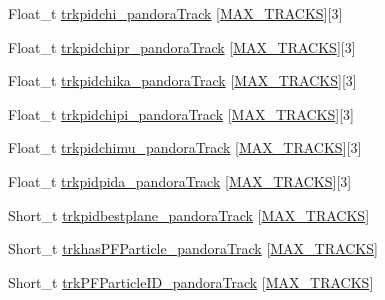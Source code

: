 \begin{DoxyCompactItemize}
\item 
Float\-\_\-t \hyperlink{classanatree_afa8d6d92e18f547d1481c2c5bf354e64}{trkpidchi\-\_\-pandora\-Track} \mbox{[}\hyperlink{anatree__core__v09410002_8h_a327fd4e796e4a0d78947524c96e4362e}{M\-A\-X\-\_\-\-T\-R\-A\-C\-K\-S}\mbox{]}\mbox{[}3\mbox{]}
\item 
Float\-\_\-t \hyperlink{classanatree_a627730b2ca665fba61264ea802ff8191}{trkpidchipr\-\_\-pandora\-Track} \mbox{[}\hyperlink{anatree__core__v09410002_8h_a327fd4e796e4a0d78947524c96e4362e}{M\-A\-X\-\_\-\-T\-R\-A\-C\-K\-S}\mbox{]}\mbox{[}3\mbox{]}
\item 
Float\-\_\-t \hyperlink{classanatree_aee3b98d0f388fbdd52ddc520b2dbdffd}{trkpidchika\-\_\-pandora\-Track} \mbox{[}\hyperlink{anatree__core__v09410002_8h_a327fd4e796e4a0d78947524c96e4362e}{M\-A\-X\-\_\-\-T\-R\-A\-C\-K\-S}\mbox{]}\mbox{[}3\mbox{]}
\item 
Float\-\_\-t \hyperlink{classanatree_ac6e609689ab0d14cc79c56d8a8e439dd}{trkpidchipi\-\_\-pandora\-Track} \mbox{[}\hyperlink{anatree__core__v09410002_8h_a327fd4e796e4a0d78947524c96e4362e}{M\-A\-X\-\_\-\-T\-R\-A\-C\-K\-S}\mbox{]}\mbox{[}3\mbox{]}
\item 
Float\-\_\-t \hyperlink{classanatree_a9d167b902c1054222e86725b09ec5829}{trkpidchimu\-\_\-pandora\-Track} \mbox{[}\hyperlink{anatree__core__v09410002_8h_a327fd4e796e4a0d78947524c96e4362e}{M\-A\-X\-\_\-\-T\-R\-A\-C\-K\-S}\mbox{]}\mbox{[}3\mbox{]}
\item 
Float\-\_\-t \hyperlink{classanatree_ac41f2bcea1bd90c759c8b1442bd08b00}{trkpidpida\-\_\-pandora\-Track} \mbox{[}\hyperlink{anatree__core__v09410002_8h_a327fd4e796e4a0d78947524c96e4362e}{M\-A\-X\-\_\-\-T\-R\-A\-C\-K\-S}\mbox{]}\mbox{[}3\mbox{]}
\item 
Short\-\_\-t \hyperlink{classanatree_ae128446738d35991ed6e5769c7237527}{trkpidbestplane\-\_\-pandora\-Track} \mbox{[}\hyperlink{anatree__core__v09410002_8h_a327fd4e796e4a0d78947524c96e4362e}{M\-A\-X\-\_\-\-T\-R\-A\-C\-K\-S}\mbox{]}
\item 
Short\-\_\-t \hyperlink{classanatree_a3d73017e5943a039c29b4af9bc7e7a3d}{trkhas\-P\-F\-Particle\-\_\-pandora\-Track} \mbox{[}\hyperlink{anatree__core__v09410002_8h_a327fd4e796e4a0d78947524c96e4362e}{M\-A\-X\-\_\-\-T\-R\-A\-C\-K\-S}\mbox{]}
\item 
Short\-\_\-t \hyperlink{classanatree_a3edd8410cece1ec89caa7c2800a746f3}{trk\-P\-F\-Particle\-I\-D\-\_\-pandora\-Track} \mbox{[}\hyperlink{anatree__core__v09410002_8h_a327fd4e796e4a0d78947524c96e4362e}{M\-A\-X\-\_\-\-T\-R\-A\-C\-K\-S}\mbox{]}

\end{DoxyCompactItemize}
